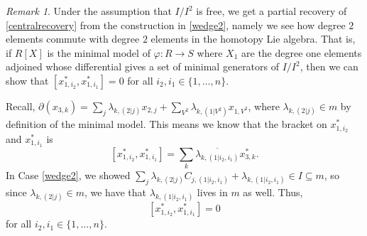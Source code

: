 \documentclass{amsart}
\theoremstyle{definition}
\theoremstyle{remark}
\newtheorem{remark}[theorem]{Remark}
\begin{document}
\begin{remark} 
\label{HLA}  Under the assumption that $I/I^2$ is free, we get a partial recovery of \cref{centralrecovery} from the construction in \cref{wedge2}, namely we see how degree $2$ elements commute with degree $2$ elements in the homotopy Lie algebra.  That is, if $R[X]$ is the minimal model of  $\varphi: R \to S$ where $X_1$ are the degree one elements adjoined whose differential gives a set of minimal generators of $I/I^2$, then we can show that $[x_{1,i_2}^*, x_{1,i_1}^*]=0$ for all $i_2,i_1 \in \{1, \ldots, n\}$. 
 
Recall, $\partial(x_{3,k})=\sum_{j} \lambda_{k,(2|j)}x_{2,j} + \sum_{V^2}\lambda_{k, (1|V^2)}x_{1,V^2}$, where $\lambda_{k,(2|j)} \in m$ by definition of the minimal model. This means we know that the bracket on $x_{1,i_2}^*$ and $ x_{1,i_1}^*$ is
 \[
 [x_{1,i_2}^*, x_{1,i_1}^*] = \sum_{k}  \overline{\lambda_{k,(1|i_2,i_1)}} x_{3,k}^*.
 \]
 In Case \ref{wedge2}, we showed $\sum_{j}\lambda_{k,(2|j)}C_{j,(1|i_2,i_1)} + \lambda_{k, (1|i_2,i_1)}\in I \subseteq m$, so since $\lambda_{k,(2|j)} \in m$, we have that $\lambda_{k,(1|i_2,i_1)}$ lives in $m$ as well. Thus,
 \[
 [x_{1,i_2}^*, x_{1,i_1}^*]=0
 \]
for all $i_2,i_1 \in \{1, \ldots, n\}$.
 
\end{remark}
 
\end{document}
